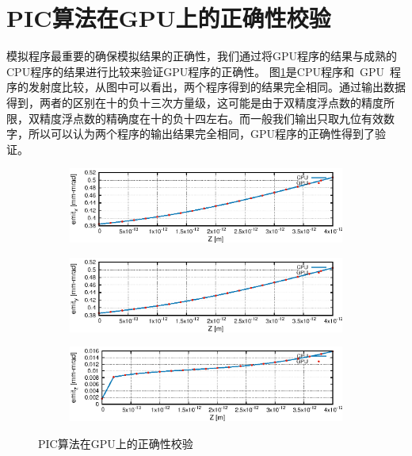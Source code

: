 \section{PIC算法在GPU上的正确性校验}
模拟程序最重要的确保模拟结果的正确性，我们通过将GPU程序的结果与成熟的CPU程序的结果进行比较来验证GPU程序的正确性。
图\ref{fig:PIC_GPU_benchmark}是CPU程序和~GPU~程序的发射度比较，从图中可以看出，两个程序得到的结果完全相同。通过输出数据得到，两者的区别在十的负十三次方量级，这可能是由于双精度浮点数的精度所限，双精度浮点数的精确度在十的负十四左右。而一般我们输出只取九位有效数字，所以可以认为两个程序的输出结果完全相同，GPU程序的正确性得到了验证。
\begin{figure}[!htb]
    \centering
    \begin{subfigure}[b]{0.9\textwidth}
        \includegraphics[width=\textwidth]{Img/PIC_GPU_benchmark_x.eps}
    \end{subfigure}
    \begin{subfigure}[b]{0.9\textwidth}
        \includegraphics[width=\textwidth]{Img/PIC_GPU_benchmark_y.eps}
    \end{subfigure}
    \begin{subfigure}[b]{0.9\textwidth}
        \includegraphics[width=\textwidth]{Img/PIC_GPU_benchmark_z.eps}
    \end{subfigure}
    \caption{PIC算法在GPU上的正确性校验}\label{fig:PIC_GPU_benchmark}
\end{figure}

